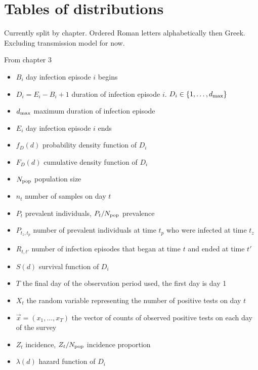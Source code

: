\documentclass[thesis.tex]{subfiles}
\begin{document}
\chapter{Tables of distributions} \label{distributions}

Currently split by chapter.
Ordered Roman letters alphabetically then Greek.
Excluding transmission model for now.

From chapter 3

\begin{itemize}
    \item $B_i$ day infection episode $i$ begins
    \item $D_i = E_i - B_i + 1$ duration of infection episode $i$. $D_i \in \{1, \dots, d_\text{max} \}$
    \item $d_\text{max}$ maximum duration of infection episode
    \item $E_i$ day infection episode $i$ ends
    \item $f_D(d)$ probability density function of $D_i$
    \item $F_D(d)$ cumulative density function of $D_i$
    \item $N_\text{pop}$ population size
    \item $n_t$ number of samples on day $t$
    \item $P_t$ prevalent individuals, $P_t / N_\text{pop}$ prevalence
    \item $P_{t_z,t_p}$ number of prevalent individuals at time $t_p$ who were infected at time $t_z$
    \item $R_{t,t'}$ number of infection episodes that began at time $t$ and ended at time $t'$
    \item $S(d)$ survival function of $D_i$
    \item $T$ the final day of the observation period used, the first day is day 1
    \item $X_t$ the random variable representing the number of positive tests on day $t$
    \item $\vec{x} = (x_1, \dots, x_T)$ the vector of counts of observed positive tests on each day of the survey
    \item $Z_t$ incidence, $Z_t / N_\text{pop}$ incidence proportion
    \item $\lambda(d)$ hazard function of $D_i$
\end{itemize}
\end{document}
